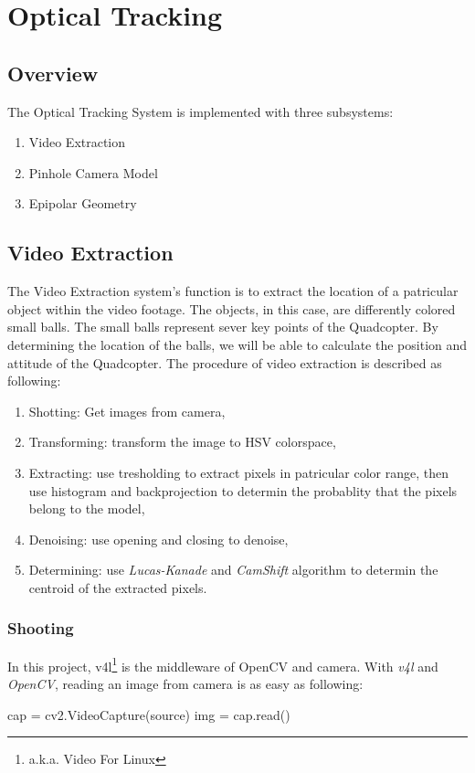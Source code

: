 \section{Optical Tracking}
\subsection{Overview}
The Optical Tracking System is implemented with three subsystems:
\begin{enumerate}
  \item Video Extraction
  \item Pinhole Camera Model
  \item Epipolar Geometry
\end{enumerate}
\subsection{Video Extraction}
The Video Extraction system's function is to extract the location of a patricular object within the video footage. The objects, in this case, are differently colored small balls. The small balls represent sever key points of the Quadcopter. By determining the location of the balls, we will be able to calculate the position and attitude of the Quadcopter.
The procedure of video extraction is described as following:
\begin{enumerate}
  \item Shotting: Get images from camera,
  \item Transforming: transform the image to HSV colorspace,
  \item Extracting: use tresholding to extract pixels in patricular color range, then use histogram and backprojection to determin the probablity that the pixels belong to the model,
  \item Denoising: use opening and closing to denoise,
  \item Determining: use \emph{Lucas-Kanade} and \emph{CamShift} algorithm to determin the centroid of the extracted pixels.
\end{enumerate}
\subsubsection{Shooting}
In this project, v4l\footnote{a.k.a. Video For Linux} is the middleware of OpenCV and camera. With \emph{v4l} and \emph{OpenCV}, reading an image from camera is as easy as following:
\lstset{language=python}
\begin{python}
cap = cv2.VideoCapture(source)
img = cap.read()
\end{python}
